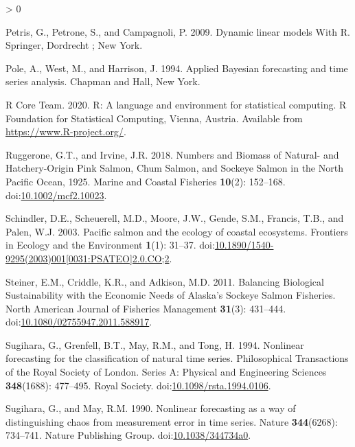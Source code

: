 \documentclass[
]{article}
\newlength{\cslhangindent}
\newenvironment{CSLReferences}[2] %
 {%
  \setlength{\parindent}{0pt}
  \ifodd #1 \everypar{\setlength{\hangindent}{\cslhangindent}}\ignorespaces\fi
  \ifnum #2 > 0
  \setlength{\parskip}{#2\baselineskip}
  \fi
 }%
 {}
\begin{document}
\begin{CSLReferences}{1}{0}
\leavevmode\hypertarget{ref-petris2009}{}%
Petris, G., Petrone, S., and Campagnoli, P. 2009. Dynamic linear models {With R}. {Springer}, {Dordrecht ; New York}.

\leavevmode\hypertarget{ref-pole1994}{}%
Pole, A., West, M., and Harrison, J. 1994. Applied {Bayesian} forecasting and time series analysis. {Chapman and Hall}, {New York}.

\leavevmode\hypertarget{ref-rcoreteam2020}{}%
R Core Team. 2020. R: A language and environment for statistical computing. R Foundation for Statistical Computing, Vienna, Austria. Available from \url{https://www.R-project.org/}.

\leavevmode\hypertarget{ref-ruggerone2018}{}%
Ruggerone, G.T., and Irvine, J.R. 2018. Numbers and {Biomass} of {Natural}- and {Hatchery}-{Origin Pink Salmon}, {Chum Salmon}, and {Sockeye Salmon} in the {North Pacific Ocean}, 1925{}. Marine and Coastal Fisheries \textbf{10}(2): 152--168. doi:\href{https://doi.org/10.1002/mcf2.10023}{10.1002/mcf2.10023}.

\leavevmode\hypertarget{ref-schindler2003}{}%
Schindler, D.E., Scheuerell, M.D., Moore, J.W., Gende, S.M., Francis, T.B., and Palen, W.J. 2003. Pacific salmon and the ecology of coastal ecosystems. Frontiers in Ecology and the Environment \textbf{1}(1): 31--37. doi:\href{https://doi.org/10.1890/1540-9295(2003)001\%5B0031:PSATEO\%5D2.0.CO;2}{10.1890/1540-9295(2003)001{[}0031:PSATEO{]}2.0.CO;2}.

\leavevmode\hypertarget{ref-steiner2011}{}%
Steiner, E.M., Criddle, K.R., and Adkison, M.D. 2011. Balancing {Biological Sustainability} with the {Economic Needs} of {Alaska}'s {Sockeye Salmon Fisheries}. North American Journal of Fisheries Management \textbf{31}(3): 431--444. doi:\href{https://doi.org/10.1080/02755947.2011.588917}{10.1080/02755947.2011.588917}.

\leavevmode\hypertarget{ref-sugihara1994}{}%
Sugihara, G., Grenfell, B.T., May, R.M., and Tong, H. 1994. Nonlinear forecasting for the classification of natural time series. Philosophical Transactions of the Royal Society of London. Series A: Physical and Engineering Sciences \textbf{348}(1688): 477--495. {Royal Society}. doi:\href{https://doi.org/10.1098/rsta.1994.0106}{10.1098/rsta.1994.0106}.

\leavevmode\hypertarget{ref-sugihara1990}{}%
Sugihara, G., and May, R.M. 1990. Nonlinear forecasting as a way of distinguishing chaos from measurement error in time series. Nature \textbf{344}(6268): 734--741. {Nature Publishing Group}. doi:\href{https://doi.org/10.1038/344734a0}{10.1038/344734a0}.


\end{CSLReferences}
\end{document}
